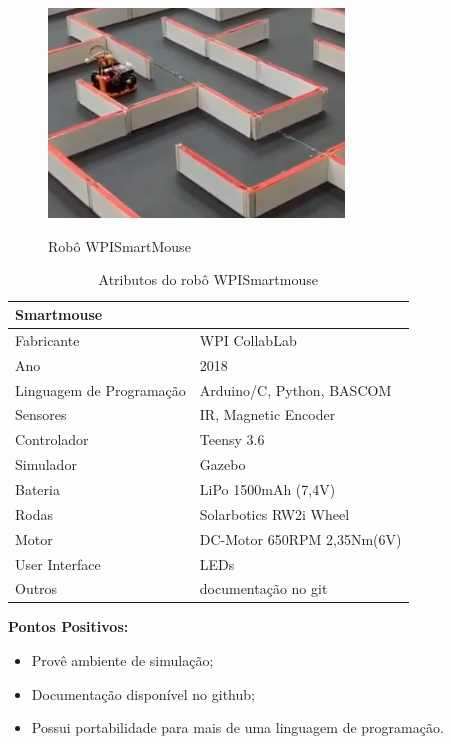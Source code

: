\begin{figure}[H]
	\centering
	\caption{Robô WPISmartMouse}
	\includegraphics[width=0.7\textwidth]
	{Figures/WPISmartMouse_model.png}
	\label{fig:WPISmartMouse_model}
\end{figure}

\begin{table}[H]
	\centering
	\caption{Atributos do robô WPISmartmouse}
	\begin{tabular}{|l|l|}
		\hline
		\multicolumn{2}{|l|}{\textbf{Smartmouse}} \\ \hline
		Fabricante & WPI CollabLab \\ \hline
		Ano & 2018 \\ \hline
		Linguagem de Programação & Arduino/C, Python, BASCOM \\ \hline
		Sensores & IR, Magnetic Encoder \\ \hline
		Controlador & Teensy 3.6 \\ \hline
		Simulador & Gazebo \\ \hline
		Bateria & LiPo 1500mAh (7,4V) \\ \hline
		Rodas & Solarbotics RW2i Wheel \\ \hline
		Motor & DC-Motor 650RPM 2,35Nm(6V) \\ \hline
		User Interface & LEDs \\ \hline
		Outros & documentação no git \\ \hline
	\end{tabular}
	\label{tab:Smartmouse}
\end{table}

\textbf{Pontos Positivos:}
\begin{itemize}
	\item Provê ambiente de simulação;
	\item Documentação disponível no github;
	\item Possui portabilidade para mais de uma linguagem de programação.
\end{itemize}

